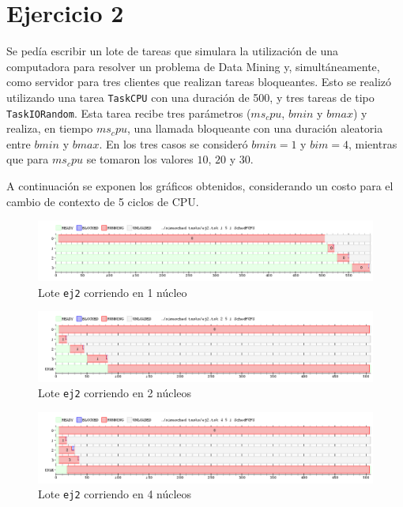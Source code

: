 \section{Ejercicio 2}

Se pedía escribir un lote de tareas que simulara la utilización de una computadora para resolver un problema de Data Mining y, simultáneamente, como servidor para tres clientes que realizan tareas bloqueantes. Esto se realizó utilizando una tarea \texttt{TaskCPU} con una duración de 500, y tres tareas de tipo \texttt{TaskIORandom}. Esta tarea recibe tres parámetros ($ms_cpu$, $bmin$ y $bmax$) y realiza, en tiempo $ms_cpu$, una llamada bloqueante con una duración aleatoria entre $bmin$ y $bmax$. En los tres casos se consideró $bmin = 1$ y $bim = 4$, mientras que para $ms_cpu$ se tomaron los valores $10$, $20$ y $30$.

A continuación se exponen los gráficos obtenidos, considerando un costo para el cambio de contexto de 5 ciclos de CPU.

\begin{figure}[H]
    \begin{center}
        \includegraphics[width=1\columnwidth]{imagenes/ej2_1.png}
        \caption{Lote \texttt{ej2} corriendo en 1 núcleo}
    \end{center}
\end{figure}

\begin{figure}[H]
    \begin{center}
        \includegraphics[width=1\columnwidth]{imagenes/ej2_2.png}
        \caption{Lote \texttt{ej2} corriendo en 2 núcleos}
    \end{center}
\end{figure}

\begin{figure}[H]
    \begin{center}
        \includegraphics[width=1\columnwidth]{imagenes/ej2_3.png}
        \caption{Lote \texttt{ej2} corriendo en 4 núcleos}
    \end{center}
\end{figure}

